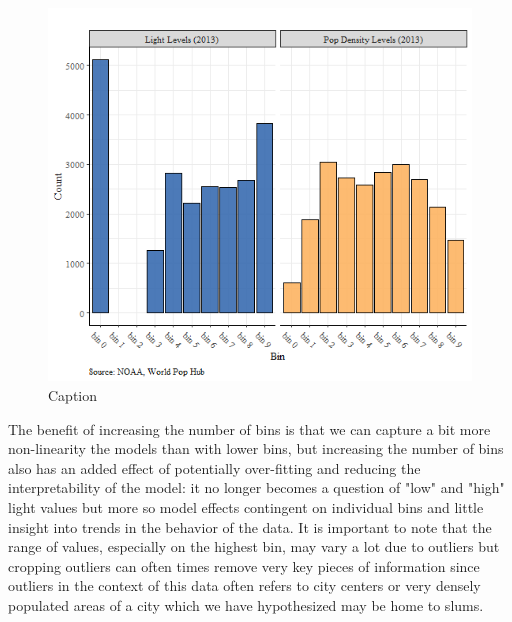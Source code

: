 \begin{figure}
    \centering
    \includegraphics[scale = 0.7]{Graphics/10BinsBar.png}
    \caption{Caption}
    \label{fig:2013discretizeddistr}
\end{figure}

The benefit of increasing the number of bins is that we can capture a bit more non-linearity the models than with lower bins, but increasing the number of bins also has an added effect of potentially over-fitting and reducing the interpretability of the model: it no longer becomes a question of "low" and "high" light values but more so model effects contingent on individual bins and little insight into trends in the behavior of the data. It is important to note that the range of values, especially on the highest bin, may vary a lot due to outliers but cropping outliers can often times remove very key pieces of information since outliers in the context of this data often refers to city centers or very densely populated areas of a city which we have hypothesized may be home to slums.

